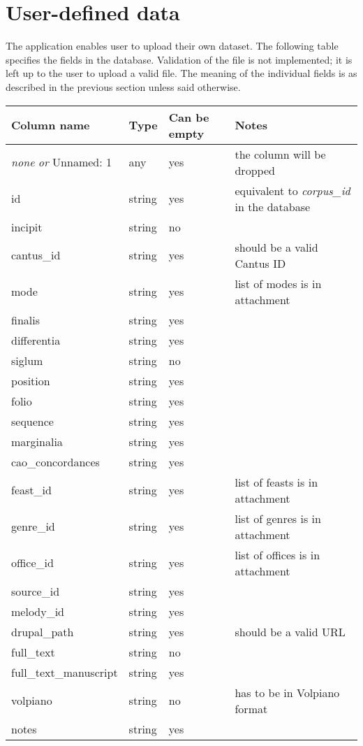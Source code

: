 \section{User-defined data}

The application enables user to upload their own dataset. The following table specifies the fields in the database. Validation of the
file is not implemented; it is left up to the user to upload a valid file. The meaning of the individual
fields is as described in the previous section unless said otherwise.

\begin{longtable}{| p{} | p{} | p{} | p{} |} 

 \hline
 Column name     & Type  & Can be empty  & Notes \\
 \hline
 \emph{none} \emph{or} Unnamed: 1 & any & yes & the column will be dropped  \\ \hline
 id             & string & yes & equivalent to \emph{corpus\_id} in the database \\ \hline
 incipit        & string & no  & \\ \hline
 cantus\_id     & string & yes & should be a valid Cantus ID \\ \hline
 mode           & string & yes & list of modes is in attachment \\ \hline
 finalis        & string & yes & \\ \hline
 differentia    & string & yes & \\ \hline
 siglum         & string & no  & \\ \hline
 position       & string & yes & \\ \hline
 folio          & string & yes & \\ \hline
 sequence       & string & yes & \\ \hline
 marginalia     & string & yes & \\ \hline
 cao\_concordances & string & yes & \\ \hline
 feast\_id      & string & yes & list of feasts is in attachment \\ \hline
 genre\_id      & string & yes & list of genres is in attachment \\ \hline
 office\_id     & string & yes & list of offices is in attachment \\ \hline
 source\_id     & string & yes & \\ \hline
 melody\_id     & string & yes & \\ \hline
 drupal\_path   & string & yes & should be a valid URL \\ \hline
 full\_text     & string & no  & \\ \hline
 full\_text\_manuscript & string & yes & \\ \hline
 volpiano       & string & no  & has to be in Volpiano format \\ \hline
 notes          & string & yes & \\
 \hline


\end{longtable}
